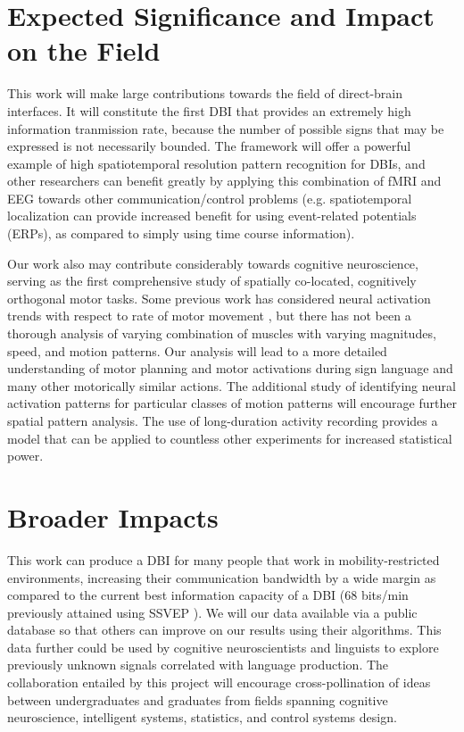 \documentclass{proposal}
\begin{document}
\section{Expected Significance and Impact on the
Field}
This work will make large contributions towards the field of direct-brain interfaces. It will constitute the first DBI that provides an extremely high information tranmission rate, because the number of possible signs that may be expressed is not necessarily bounded. The framework will offer a powerful example of high spatiotemporal resolution pattern recognition for DBIs, and other researchers can benefit greatly by applying this combination of fMRI and EEG towards other communication/control problems (e.g. spatiotemporal localization can provide increased benefit for using event-related potentials (ERPs), as compared to simply using time course information).

Our work also may contribute considerably towards cognitive neuroscience, serving as the first comprehensive study of spatially co-located, cognitively orthogonal motor tasks. Some previous work has considered neural activation trends with respect to rate of motor movement \cite{rao1996rbf}, but there has not been a thorough analysis of varying combination of muscles with varying magnitudes, speed, and motion patterns. Our analysis will lead to a more detailed understanding of motor planning and motor activations during sign language and many other motorically similar actions. The additional study of identifying neural activation patterns for particular classes of motion patterns will encourage further spatial pattern analysis. The use of long-duration activity recording provides a model that can be applied to countless other experiments for increased statistical power.


\section{Broader Impacts}

This work can produce a DBI for many people that work in mobility-restricted environments, increasing their communication bandwidth by a wide margin as compared to the current best information capacity of a DBI (68 bits/min previously attained using SSVEP \cite{gao2003bbe}). We will our data available via a public database so that others can improve on our results using their algorithms. This data further could be used by cognitive neuroscientists and linguists to explore previously unknown signals correlated with language production. The collaboration entailed by this project will encourage cross-pollination of ideas between undergraduates and graduates from fields spanning cognitive neuroscience, intelligent systems, statistics, and control systems design.
\end{document}
